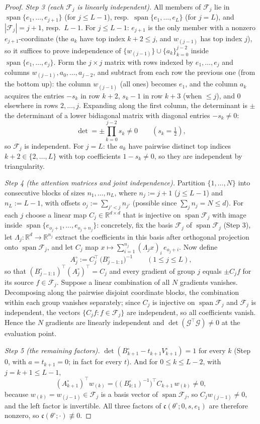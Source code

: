 \documentclass[11pt]{article}
\theoremstyle{definition}
\theoremstyle{remark}
\theoremstyle{plain}
\newcommand{\R}{\mathbb{R}}
\newcommand{\cF}{\mathcal{F}}
\newcommand{\spn}{\operatorname{span}}
\begin{document}
\begin{proof}
\emph{Step 3 (each $\cF_j$ is linearly independent).}  All members of $\cF_j$ lie in
$\spn\{e_1,\dots,e_{j+1}\}$ (for $j\le L-1$), resp.\ $\spn\{e_1,\dots,e_L\}$ (for
$j=L$), and $|\cF_j|=j+1$, resp.\ $L-1$.  For $j\le L-1$: $e_{j+1}$ is the only member
with a nonzero $e_{j+1}$-coordinate (the $a_k$ have top index $k+2\le j$, and
$w_{(j-1)}$ has top index $j$), so it suffices to prove independence of
$\{w_{(j-1)}\}\cup\{a_k\}_{k=0}^{j-2}$ inside $\spn\{e_1,\dots,e_j\}$.  Form the
$j\times j$ matrix with rows indexed by $e_1,\dots,e_j$ and columns
$w_{(j-1)},a_0,\dots,a_{j-2}$, and subtract from each row the previous one (from the
bottom up): the column $w_{(j-1)}$ (all ones) becomes $e_1$, and the column $a_k$
acquires the entries $-s_k$ in row $k+2$, $s_k-1$ in row $k+3$ (when $\le j$), and $0$
elsewhere in rows $2,\dots,j$.  Expanding along the first column, the determinant is
$\pm$ the determinant of a lower bidiagonal matrix with diagonal entries $-s_k\neq0$:
\[
\det=\pm\prod_{k=0}^{j-2}s_k\neq0\qquad(s_k=\tfrac12),
\]
so $\cF_j$ is independent.  For $j=L$: the $a_k$ have pairwise distinct top indices
$k+2\in\{2,\dots,L\}$ with top coefficients $1-s_k\neq0$, so they are independent by
triangularity.

\emph{Step 4 (the attention matrices and joint independence).}  Partition
$\{1,\dots,N\}$ into consecutive blocks of sizes $n_1,\dots,n_L$, where
$n_j:=j+1$ ($j\le L-1$) and $n_L:=L-1$, with offsets $o_j:=\sum_{j'<j}n_{j'}$
(possible since $\sum_jn_j=N\le d$).  For each $j$ choose a linear map
$C_j\in\R^{d\times d}$ that is injective on $\spn\cF_j$ with image inside
$\spn\{e_{o_j+1},\dots,e_{o_j+n_j}\}$: concretely, fix the basis $\cF_j$ of
$\spn\cF_j$ (Step 3), let $\Lambda_j:\R^d\to\R^{n_j}$ extract the coefficients in this
basis after orthogonal projection onto $\spn\cF_j$, and let $C_j$ map
$x\mapsto\sum_{i=1}^{n_j}(\Lambda_jx)_i\,e_{o_j+i}$.  Now define
\[
A^\circ_j:=C_j^\top\,\big(B^\circ_{j-1:1}\big)^{-1}\qquad(1\le j\le L),
\]
so that $(B^\circ_{j-1:1})^\top(A^\circ_j)^\top=C_j$ and every gradient of group $j$
equals $\pm C_jf$ for its source $f\in\cF_j$.  Suppose a linear combination of all $N$
gradients vanishes.  Decomposing along the pairwise disjoint coordinate blocks, the
combination within each group vanishes separately; since $C_j$ is injective on
$\spn\cF_j$ and $\cF_j$ is independent, the vectors $\{C_jf:f\in\cF_j\}$ are
independent, so all coefficients vanish.  Hence the $N$ gradients are linearly
independent and $\det(\mathcal G^\top\mathcal G)\neq0$ at the evaluation point.

\emph{Step 5 (the remaining factors).}  $\det(B^\circ_{k+1}-t_{k+1}V^\circ_{k+1})=1$
for every $k$ (Step 0, with $a=t_{k+1}=0$; in fact for every $t$).  And for
$0\le k\le L-2$, with $j=k+1\le L-1$,
\[
(A^\circ_{k+1})^\top w_{(k)}
=\big((B^\circ_{k:1})^{-1}\big)^\top C_{k+1}\,w_{(k)}\neq0,
\]
because $w_{(k)}=w_{(j-1)}\in\cF_j$ is a basis vector of $\spn\cF_j$, so
$C_{j}w_{(j-1)}\neq0$, and the left factor is invertible.  All three factors of
$\mathfrak c(\theta^\circ;0,s,e_1)$ are therefore nonzero, so
$\mathfrak c(\theta^\circ;\cdot)\not\equiv0$.
\end{proof}
\end{document}
